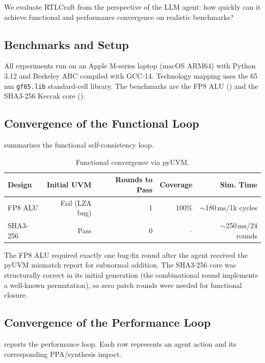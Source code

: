 \documentclass[11pt]{article}
\begin{document}
We evaluate RTLCraft from the perspective of the LLM agent: how quickly can it achieve functional and performance convergence on realistic benchmarks?

\subsection{Benchmarks and Setup}

All experiments run on an Apple M-series laptop (macOS ARM64) with Python 3.12 and Berkeley ABC compiled with GCC-14. Technology mapping uses the 65\,nm \texttt{gf65.lib} standard-cell library. The benchmarks are the FP8 ALU () and the SHA3-256 Keccak core ().

\subsection{Convergence of the Functional Loop}
\label{sec:exp_func}

 summarizes the functional self-consistency loop.

\begin{table}[htbp]
\centering
\caption{Functional convergence via pyUVM.}
\label{tab:func_convergence}
\begin{tabular}{@{}lrrrr@{}}
\toprule
\textbf{Design} & \textbf{Initial UVM} & \textbf{Rounds to Pass} & \textbf{Coverage} & \textbf{Sim. Time} \\
\midrule
FP8 ALU & Fail (LZA bug) & 1 & 100\% & $\sim$180\,ms/1k cycles \\
SHA3-256 & Pass & 0 & -- & $\sim$250\,ms/24 rounds \\
\bottomrule
\end{tabular}
\end{table}

The FP8 ALU required exactly one bug-fix round after the agent received the pyUVM mismatch report for subnormal addition. The SHA3-256 core was structurally correct in its initial generation (the combinational round implements a well-known permutation), so zero patch rounds were needed for functional closure.

\subsection{Convergence of the Performance Loop}
\label{sec:exp_perf}

 reports the performance loop. Each row represents an agent action and its corresponding PPA/synthesis impact.
\end{document}
